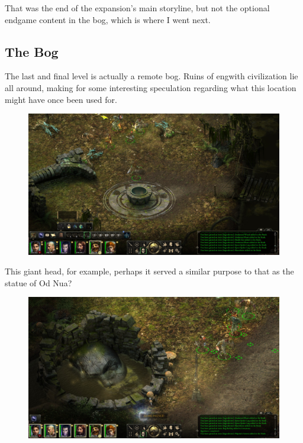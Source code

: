 \documentclass{article}
\begin{document}
That was the end of the expansion's main storyline, but not the optional endgame content in the bog, which is where I went next.

\subsection{The Bog}
The last and final level is actually a remote bog.  Ruins of engwith civilization lie all around, making for some interesting speculation regarding what this location might have once been used for.

\begin{figure}
\includegraphics[scale=0.33]{files/blog/2020_01_18_poe_potd_wmpt2/2020_01_18_bog1.jpg}
\end{figure}

This giant head, for example, perhaps it served a similar purpose to that as the statue of Od Nua?

\begin{figure}
\includegraphics[scale=0.33]{files/blog/2020_01_18_poe_potd_wmpt2/2020_01_18_bog2.jpg}
\end{figure}
\end{document}
